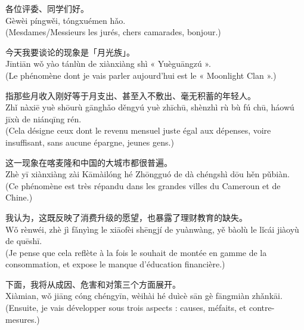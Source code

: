 \documentclass[11pt]{article}
\begin{document}
\begin{textebox}
各位评委、同学们好。\\
Gèwèi píngwěi, tóngxuémen hǎo.\\
(Mesdames/Messieurs les jurés, chers camarades, bonjour.)

今天我要谈论的现象是「月光族」。\\
Jīntiān wǒ yào tánlùn de xiànxiàng shì « Yuèguāngzú ».\\
(Le phénomène dont je vais parler aujourd'hui est le « Moonlight Clan ».)

指那些月收入刚好等于月支出、甚至入不敷出、毫无积蓄的年轻人。\\
Zhǐ nàxiē yuè shōurù gānghǎo děngyú yuè zhīchū, shènzhì rù bù fú chū, háowú jīxù de niánqīng rén.\\
(Cela désigne ceux dont le revenu mensuel juste égal aux dépenses, voire insuffisant, sans aucune épargne, jeunes gens.)

这一现象在喀麦隆和中国的大城市都很普遍。\\
Zhè yī xiànxiàng zài Kāmàilóng hé Zhōngguó de dà chéngshì dōu hěn pǔbiàn.\\
(Ce phénomène est très répandu dans les grandes villes du Cameroun et de Chine.)

我认为，这既反映了消费升级的愿望，也暴露了理财教育的缺失。\\
Wǒ rènwéi, zhè jì fǎnyìng le xiāofèi shēngjí de yuànwàng, yě bàolù le lǐcái jiàoyù de quēshī.\\
(Je pense que cela reflète à la fois le souhait de montée en gamme de la consommation, et expose le manque d'éducation financière.)

下面，我将从成因、危害和对策三个方面展开。\\
Xiàmian, wǒ jiāng cóng chéngyīn, wèihài hé duìcè sān gè fāngmiàn zhǎnkāi.\\
(Ensuite, je vais développer sous trois aspects : causes, méfaits, et contre-mesures.)
\end{textebox}
\end{document}
